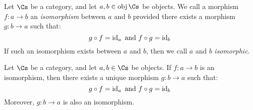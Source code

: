 \begin{definition}
  Let $\Cs$ be a category, and let $a,b \in \obj{\Cs}$ be objects. We
  call a morphism $f:a \xrightarrow{} b$ an \textit{isomorphism}
  between $a$ and $b$ provided there exists a morphism $g:b
  \xrightarrow{} a$ such that:
  \begin{equation*}
    g \circ f=\operatorname{id}_a \text{ and } f \circ g=\operatorname{id}_b
  \end{equation*}
  If such an isomorphism exists between $a$ and $b$, then we call $a$
  and $b$ \textit{isomorphic}.
\end{definition}

\begin{lemma}\label{lemma_1.1.1}
  Let $\Cs$ be a category, and let $a,b \in \Cs$ be objects. If $f:a
  \xrightarrow{} b$ is an isomorphism, then there exists a unique
  morphism $g:b \xrightarrow{} a$ such that:
  \begin{equation*}
    g \circ f=\operatorname{id}_a \text{ and } f \circ g=\operatorname{id}_b
  \end{equation*}
  Moreover, $g:b \xrightarrow{} a$ is also an isomorphism.
\end{lemma}


